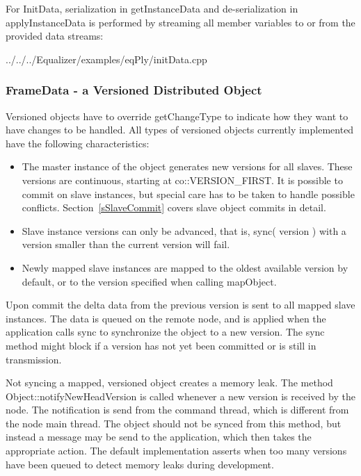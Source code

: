 \documentclass[10pt,a4]{scrartcl}
\newcommand{\sref}[1]{Section~\ref{#1}}
\begin{document}
For \textsf{InitData}, serialization in \textsf{getInstanceData}
and de-serialization in \textsf{applyInstanceData} is performed by
streaming all member variables to or from the provided data
streams:

{\footnotesize
  {../../../Equalizer/examples/eqPly/initData.cpp}}

\subsubsection{FrameData - a Versioned Distributed Object}

Versioned objects have to override \textsf{getChangeType} to indicate
how they want to have changes to be handled. All types of versioned
objects currently implemented have the following characteristics:

\begin{itemize}
\item The master instance of the object generates new versions for all
  slaves. These versions are continuous, starting at
  \textsf{co::VERSION\_FIRST}. It is possible to commit on slave instances, but
  special care has to be taken to handle possible conflicts. \sref{sSlaveCommit}
  covers slave object commits in detail.
\item Slave instance versions can only be advanced, that is, \textsf{sync(
  version )} with a version smaller than the current version will fail.
\item Newly mapped slave instances are mapped to the oldest available
  version by default, or to the version specified when calling
  \textsf{mapObject}.
\end{itemize}

Upon \textsf{commit} the delta data from the previous version is sent to
all mapped slave instances. The data is queued on the remote node, and
is applied when the application calls \textsf{sync} to synchronize the
object to a new version. The \textsf{sync} method might block if a
version has not yet been committed or is still in transmission.

Not syncing a mapped, versioned object creates a memory leak. The method
\textsf{Object::notifyNewHeadVersion} is called whenever a new version
is received by the node. The notification is send from the command
thread, which is different from the node main thread. The object should
not be synced from this method, but instead a message may be send to the
application, which then takes the appropriate action. The default
implementation asserts when too many versions have been queued
to detect memory leaks during development.
\end{document}
